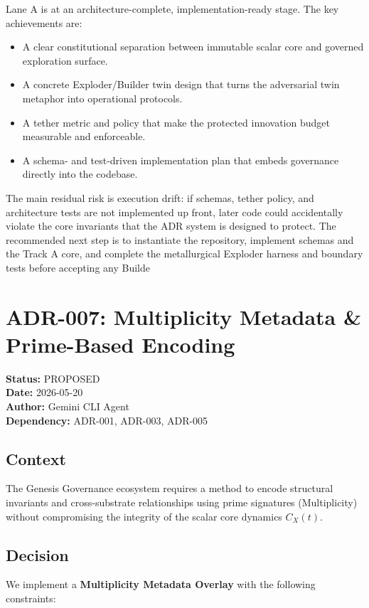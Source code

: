 \documentclass[11pt]{article}
\begin{document}
Lane A is at an architecture-complete, implementation-ready stage. The key achievements are:
\begin{itemize}
  \item A clear constitutional separation between immutable scalar core and governed exploration surface.
  \item A concrete Exploder/Builder twin design that turns the adversarial twin metaphor into operational protocols.
  \item A tether metric and policy that make the protected innovation budget measurable and enforceable.
  \item A schema- and test-driven implementation plan that embeds governance directly into the codebase.
\end{itemize}

The main residual risk is execution drift: if schemas, tether policy, and architecture tests are not implemented up front, later code could accidentally violate the core invariants that the ADR system is designed to protect. The recommended next step is to instantiate the repository, implement schemas and the Track A core, and complete the metallurgical Exploder harness and boundary tests before accepting any Builde

\section{ADR-007: Multiplicity Metadata \& Prime-Based Encoding}
\textbf{Status:} PROPOSED \\
\textbf{Date:} 2026-05-20 \\
\textbf{Author:} Gemini CLI Agent \\
\textbf{Dependency:} ADR-001, ADR-003, ADR-005

\subsection{Context}
The Genesis Governance ecosystem requires a method to encode structural invariants and cross-substrate relationships using prime signatures (Multiplicity) without compromising the integrity of the scalar core dynamics $C_X(t)$.

\subsection{Decision}
We implement a \textbf{Multiplicity Metadata Overlay} with the following constraints:
\end{document}

